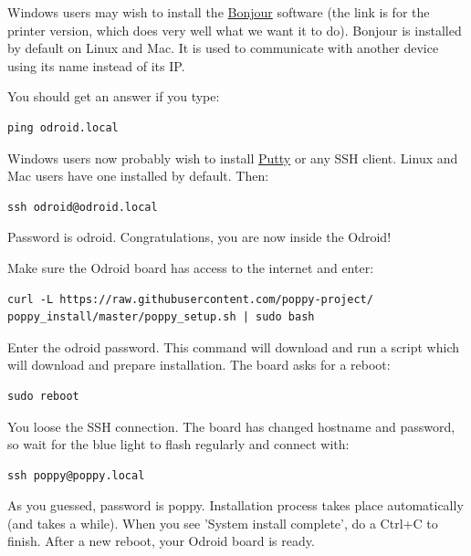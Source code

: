 \documentclass[includefoot]{article}
\begin{document}
Windows users may wish to install the \href{https://support.apple.com/kb/DL999?locale=fr_FR&viewlocale=fr_FR}{Bonjour} software (the link is for the printer version, which does very well what we want it to do). Bonjour is installed by default on Linux and Mac. It is used to communicate with another device using its name instead of its IP.

You should get an answer if you type:

\begin{verbatim}
ping odroid.local
\end{verbatim}

Windows users now probably wish to install \href{http://www.putty.org/}{Putty} or any SSH client. Linux and Mac users have one installed by default. Then:

\begin{verbatim}
ssh odroid@odroid.local
\end{verbatim}

Password is odroid. Congratulations, you are now inside the Odroid!

Make sure the Odroid board has access to the internet and enter:

\begin{verbatim}
curl -L https://raw.githubusercontent.com/poppy-project/
poppy_install/master/poppy_setup.sh | sudo bash
\end{verbatim}


Enter the odroid password. This command will download and run a script which will download and prepare installation. The board asks for a reboot:

\begin{verbatim}
sudo reboot
\end{verbatim}

You loose the SSH connection. The board has changed hostname and password, so wait for the blue light to flash regularly and connect with:

\begin{verbatim}
ssh poppy@poppy.local
\end{verbatim}

As you guessed, password is poppy. Installation process takes place automatically (and takes a while). When you see 'System install complete', do a Ctrl+C to finish. After a new reboot, your Odroid board is ready.

\end{document}
